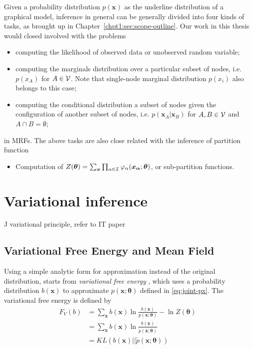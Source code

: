 Given a probability distribution $p(\bm{x})$ as the underline distribution of a graphical model, inference in general can be generally divided into four kinds of tasks, as brought up in Chapter~\ref{chpt1:sec:scope-outline}. Our work in this thesis would closed involved with the problems
\begin{itemize}
\item computing the likelihood of observed data or unobserved random variable;
\item computing the marginals distribution over a particular subset of nodes, i.e. $p(x_A)$ for $A \in \mathcal{V}$. Note that single-node marginal distribution $p(x_i)$ also belongs to this case;
\item computing the conditional distribution a subset of nodes given the configuration of another subset of nodes, i.e. $p(\bm{x}_A| \bm{x}_B)$ for $A, B \in \mathcal{V}$ and $A \cap B = \emptyset$;
\end{itemize}
in MRFs. The above tasks are also close related with the inference of partition function
\begin{itemize}
\item Computation of $Z(\bm{\theta}) = \sum_{\bm{x}} \prod_{\alpha \in \mathcal{I}} \varphi_{\alpha}(\bm{x_{\alpha}};\bm{\theta})$, or sub-partition functions.
\end{itemize}



\section{Variational inference}J
variational principle, refer to IT paper\cite{yedida2005constucting}


\subsection{Variational Free Energy and Mean Field}
Using a simple analytic form for approximation instead of the original distribution, starts from \textit{variational free energy} \cite{opper2001advanced}, which uses a probability distribution $b(\bm{x})$ to approximate $p(\bm{x};\bm{\theta})$ defined in \eqref{eq:joint-px}. The variational free energy is defined by
\begin{align}
  F_V(b) &= \sum_{\bm{x}}b(\bm{x}) \ln{\frac{b(\bm{x})}{{p}(\bm{x}; \bm{\theta})}} - \ln{Z(\bm{\theta})} \nonumber \\
         & = \sum_{\bm{x}}b(\bm{x}) \ln{\frac{b(\bm{x})}{\tilde{p}(\bm{x};
           \bm{\theta})}} \nonumber \\
         & = KL(b( \bm{x}) || \tilde{p}(\bm{x}; \bm{\theta}))
\end{align}

